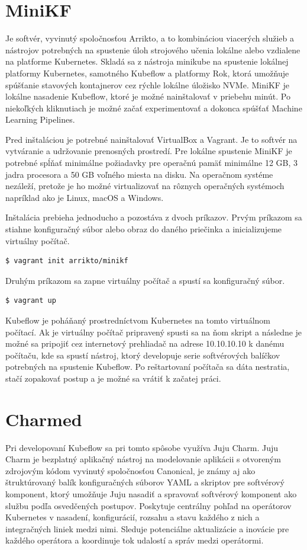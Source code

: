\section{MiniKF}

Je softvér, vyvinutý spoločnosťou Arrikto, a to kombináciou viacerých služieb a nástrojov potrebných na spustenie úloh strojového učenia lokálne alebo vzdialene na platforme Kubernetes. Skladá sa z nástroja minikube na spustenie lokálnej platformy Kubernetes, samotného Kubeflow a platformy Rok, ktorá umožňuje spúšťanie stavových kontajnerov cez rýchle lokálne úložisko NVMe. MiniKF je lokálne nasadenie Kubeflow, ktoré je možné nainštalovať v priebehu minút. Po niekoľkých kliknutiach je možné začať experimentovať a dokonca spúšťať Machine Learning Pipelines.

Pred inštaláciou je potrebné nainštalovať VirtualBox a Vagrant. Je to softvér na vytváranie a udržovanie prenosných prostredí. Pre lokálne spustenie MiniKF je potrebné spĺňať minimálne požiadavky pre operačnú pamäť minimálne 12 GB, 3 jadra procesora a 50 GB voľného miesta na disku. Na operačnom systéme nezáleží, pretože je ho možné virtualizovať na rôznych operačných systémoch napríklad ako je Linux, macOS a Windows.

Inštalácia prebieha jednoducho a pozostáva z dvoch príkazov. Prvým príkazom sa stiahne konfiguračný súbor alebo obraz do daného priečinka a inicializujeme virtuálny počítač.
\begin{lstlisting}[language=Bash]
    $ vagrant init arrikto/minikf
    \end{lstlisting}
Druhým príkazom sa zapne virtuálny počítač a spustí sa konfiguračný súbor.
\begin{lstlisting}[language=Bash]
    $ vagrant up
    \end{lstlisting}
Kubeflow je poháňaný prostredníctvom Kubernetes na tomto virtuálnom počítací. Ak je virtuálny počítač pripravený spusti sa na ňom skript a následne je možné sa pripojiť cez internetový prehliadač na adrese 10.10.10.10 k danému počítaču, kde sa spustí nástroj, ktorý developuje serie softvérových balíčkov potrebných na spustenie Kubeflow. Po reštartovaní počítača sa dáta nestratia, stačí zopakovať postup a je možné sa vrátiť k začatej práci.

\section{Charmed}

Pri developovaní Kubeflow sa pri tomto spôsobe využíva Juju Charm. Juju Charm je bezplatný aplikačný nástroj na modelovanie aplikácii s otvoreným zdrojovým kódom vyvinutý spoločnosťou Canonical, je známy aj ako štruktúrovaný balík konfiguračných súborov YAML a skriptov pre softvérový komponent, ktorý umožňuje Juju nasadiť a spravovať softvérový komponent ako službu podľa osvedčených postupov. Poskytuje centrálny pohľad na operátorov Kubernetes v nasadení, konfigurácií, rozsahu a stavu každého z nich a integračných liniek medzi nimi. Sleduje potenciálne aktualizácie a inovácie pre každého operátora a koordinuje tok udalostí a správ medzi operátormi.


